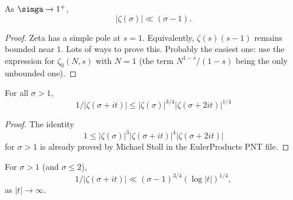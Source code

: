 \begin{lemma}\label{ZetaNear1Bnd}\leanok
As $\simga\to1^+$,
$$
|\zeta(\sigma)| \ll (\sigma-1).
$$
\end{lemma}


\begin{proof}
Zeta has a simple pole at $s=1$. Equivalently, $\zeta(s)(s-1)$ remains bounded near $1$.
Lots of ways to prove this.
Probably the easiest one: use the expression for $\zeta_0 (N,s)$ with $N=1$ (the term $N^{1-s}/(1-s)$ being the only unbounded one).
\end{proof}


\begin{lemma}[ZetaInvBound1]\label{ZetaInvBound1}\leanok
For all $\sigma>1$,
$$
1/|\zeta(\sigma+it)| \le |\zeta(\sigma)|^{3/4}|\zeta(\sigma+2it)|^{1/4}
$$
\end{lemma}


\begin{proof}
The identity
$$
1 \le |\zeta(\sigma)|^3 |\zeta(\sigma+it)|^4 |\zeta(\sigma+2it)|
$$
for $\sigma>1$
is already proved by Michael Stoll in the EulerProducts PNT file.
\end{proof}


\begin{lemma}[ZetaInvBound2]\label{ZetaInvBound2}\leanok
For $\sigma>1$ (and $\sigma \le 2$),
$$
1/|\zeta(\sigma+it)| \ll (\sigma-1)^{3/4}(\log |t|)^{1/4},
$$
as $|t|\to\infty$.
\end{lemma}


